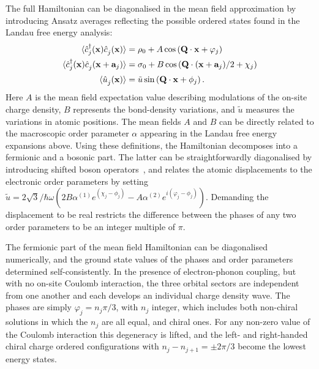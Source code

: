 \documentclass[aps,prl,twocolumn,superscriptaddress,groupedaddress]{revtex4}
\begin{document}
The full Hamiltonian can be diagonalised in the mean field approximation by introducing Ansatz averages reflecting the possible ordered states found in the Landau free energy analysis:
\begin{align}
\langle \hat{c}_{j}^{\dagger}({\bf x}) \hat{c}_{j}^{\phantom \dagger}({\bf x}) \rangle &= \rho_0 + A \cos\left( {\bf Q} \cdot {\bf x} + \varphi_j \right) \notag \\
\langle \hat{c}_{j}^{\dagger}({\bf x}) \hat{c}_{j}^{\phantom \dagger}({\bf x} + {\bf a}_j) \rangle &= \sigma_0 + B \cos\left(  {\bf Q} \cdot ({\bf x} + {\bf a}_j)/2 + \chi_j \right) \notag \\
\langle \hat{u}_{j}^{\phantom \dagger}({\bf x}) \rangle &= \tilde{u} \sin\left(  {\bf Q} \cdot {\bf x} + \phi_j \right).
\end{align}
Here $A$ is the mean field expectation value describing modulations of the on-site charge density, $B$ represents the bond-density variations, and $\tilde{u}$ measures the variations in atomic positions. The mean fields $A$ and $B$ can be directly related to the macroscopic order parameter $\alpha$ appearing in the Landau free energy expansions above. Using these definitions, the Hamiltonian decomposes into a fermionic and a bosonic part. The latter can be straightforwardly diagonalised by introducing shifted boson operators~\cite{wezel10_TiSe2_CDW}, and relates the atomic displacements to the electronic order parameters by setting $\tilde{u} = {2\sqrt{3}}/{\hbar \omega} (2B\alpha^{(1)} e^{(\chi_j-\phi_j)} -A \alpha^{(2)} e^{i(\varphi_j-\phi_j)})$. Demanding the displacement to be real restricts the difference between the phases of any two order parameters to be an integer multiple of $\pi$. 

The fermionic part of the mean field Hamiltonian can be diagonalised numerically, and the ground state values of the phases and order parameters determined self-consistently. In the presence of electron-phonon coupling, but with no on-site Coulomb interaction, the three orbital sectors are independent from one another and each develops an individual charge density wave. The phases are simply $\varphi_j = n_j {\pi}/{3}$, with $n_j$ integer, which includes both non-chiral solutions in which the $n_j$ are all equal, and chiral ones. For any non-zero value of the Coulomb interaction this degeneracy is lifted, and the left- and right-handed chiral charge ordered configurations with $n_{j}-n_{j+1} = \pm {2\pi}/{3}$ become the lowest energy states. 
\end{document}
